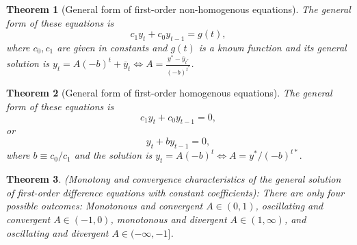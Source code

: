 \documentclass{article}
\newtheorem{theorem}{Theorem}
\theoremstyle{definition}
\theoremstyle{Solution}
\begin{document}
\begin{theorem}[General form of first-order non-homogenous equations]
The general form of these equations is
\begin{equation}
	c_1y_t+c_0y_{t-1}=g(t),
\end{equation}
where $c_0,c_1$ are given in constants and $g(t)$ is a known function and its general solution is $y_t=A(-b)^t+\overline{y}_t \Leftrightarrow A=\frac{y^*-\overline{y}_{t^*}}{(-b)^{t^*}}$.
\end{theorem}

\begin{theorem}[General form of first-order homogenous equations]
The general form of these equations is
\begin{equation}
	c_1y_t+c_0y_{t-1}=0,
\end{equation}
or
\begin{equation}
	y_t+by_{t-1}=0,
\end{equation}
where $b\equiv c_0/c_1$ and the solution is $y_t=A(-b)^t \Leftrightarrow A=y^*/(-b)^{t*}.$
\end{theorem}

\begin{theorem}
(Monotony and convergence characteristics of the general solution of first-order difference equations with constant coefficients):
There are only four possible outcomes: Monotonous and convergent $A \in (0,1)$, oscillating and convergent $A \in (-1,0)$, monotonous and divergent $A \in (1,\infty)$, and oscillating and divergent $A \in (-\infty,-1]$.
\end{theorem}
\end{document}
